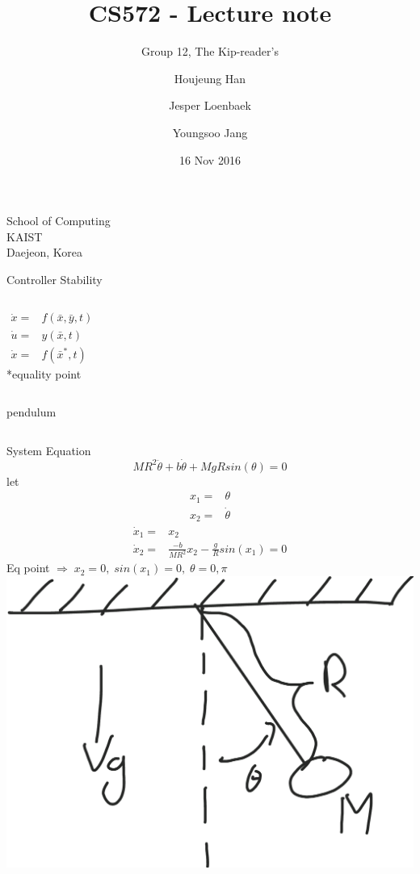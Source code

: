 \documentclass{beamer}
\begin{document}
\title{CS572 - Lecture note}
\subtitle{Group 12, The Kip-reader's}
\author{Houjeung Han \and Jesper Loenbaek \and Youngsoo Jang}
\institute%
{
    School of Computing\\
    KAIST\\
    Daejeon, Korea
}

\date{16 Nov 2016}
\frame{\titlepage}

\begin{frame}{Controller Stability}
    \begin{columns}[T]
    \begin{align*}
        \dot{x} =& f(\bar{x},\bar{y},t)\\
        \dot{u} =& y(\bar{x},t)\\
        \dot{x} =& f(\bar{x}^*,t)
    \end{align*}
    *equality point
    \end{columns}
\end{frame}

\begin{frame}{pendulum}
    \begin{columns}[T]
    System Equation
    $$MR^2 \ddot{\theta} + b\dot{\theta} + MgRsin(\theta)=0$$
    let
    \vspace*{-0.5cm}
    \begin{align*}
        x_1 =& \theta\\
        x_2 =& \dot{\theta}
    \end{align*}
    \vspace*{-1cm}
    \begin{align*}
        \dot{x}_1 =& x_2\\
        \dot{x}_2 =& \frac{-b}{MR^2}x_2-\frac{g}{R}sin(x_1)=0
    \end{align*}
    Eq point $\Rightarrow \; x_2=0,\; sin(x_1)=0,\; \theta=0,\pi$
        \includegraphics[width=\textwidth]{fig/pendulum.png}   
    \end{columns}
\end{frame}
\end{document}
